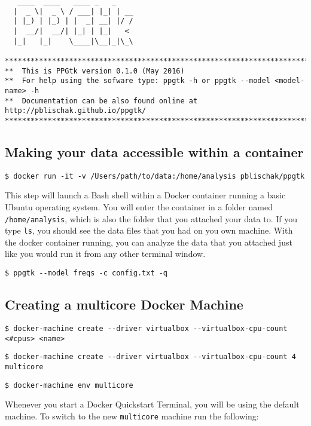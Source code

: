 \documentclass[11pt,english,letterpaper,oneside]{article}
\newcommand{\code}[1]{\hspace{5pt} \texttt{\$ #1}}
\begin{document}
\begin{framed}

\begin{verbatim}
   ____  ____   ____ _   _    
  |  _ \|  _ \ / ___| |_| | __
  | |_) | |_) | |  _| __| |/ / 
  |  __/|  __/| |_| | |_|   <  
  |_|   |_|    \____|\__|_|\_\

********************************************************************************
**  This is PPGtk version 0.1.0 (May 2016)
**  For help using the sofware type: ppgtk -h or ppgtk --model <model-name> -h
**  Documentation can be also found online at http://pblischak.github.io/ppgtk/
********************************************************************************
\end{verbatim}

\end{framed}

\subsection{Making your data accessible within a container}

\code{docker run -it -v /Users/path/to/data:/home/analysis pblischak/ppgtk}

This step will launch a Bash shell within a Docker container running a basic Ubuntu operating system. You will enter the container in a folder named \texttt{/home/analysis}, which is also the folder that you attached your data to. If you type \texttt{ls}, you should see the data files that you had on you own machine. With the docker container running, you can analyze the data that you attached just like you would run it from any other terminal window.

\code{ppgtk -{}-model freqs -c config.txt -q}

\subsection{Creating a multicore Docker Machine}

\code{docker-machine create -{}-driver virtualbox -{}-virtualbox-cpu-count <\#cpus> <name>}

\code{docker-machine create -{}-driver virtualbox -{}-virtualbox-cpu-count 4 multicore}

\code{docker-machine env multicore}

Whenever you start a Docker Quickstart Terminal, you will be using the default machine. To switch to the new \texttt{multicore} machine run the following:
\end{document}

